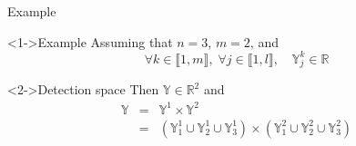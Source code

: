 \documentclass{beamer}
\begin{document}
        \begin{frame}{Example}
            \begin{exampleblock}<1->{Example}
                Assuming that $n = 3$, $m = 2$, and
                $$\forall k \in \llbracket 1, m\rrbracket, \;  \forall j \in \llbracket 1, l\rrbracket, \quad \mathbb{Y}_j^k \in \mathbb{R}$$
            \end{exampleblock}
            \begin{exampleblock}<2->{Detection space}
                Then $\mathbb{Y} \in \mathbb{R}^2$ and
                \begin{eqnarray}
                    \mathbb{Y} & = & \mathbb{Y}^1 \times \mathbb{Y}^2 \\
                    & = & \left(\mathbb{Y}_1^1 \cup \mathbb{Y}_2^1 \cup \mathbb{Y}_3^1\right) \times \left(\mathbb{Y}_1^2 \cup \mathbb{Y}_2^2 \cup \mathbb{Y}_3^2\right)
                \end{eqnarray}
            \end{exampleblock}
        \end{frame}
\end{document}

